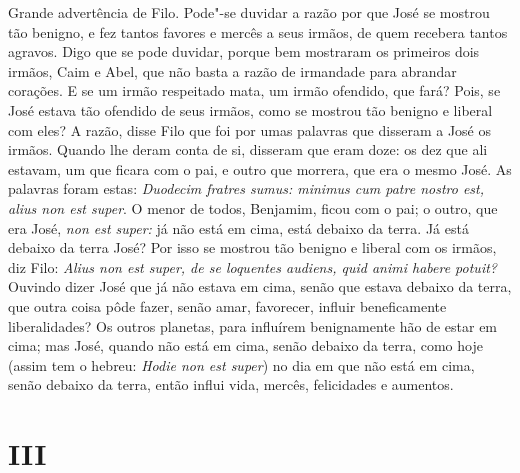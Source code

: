 Grande advertência de Filo. Pode"-se duvidar a razão por que José se
mostrou tão benigno, e fez tantos favores e mercês a seus irmãos, de
quem recebera tantos agravos. Digo que se pode duvidar, porque bem
mostraram os primeiros dois irmãos, Caim e Abel, que não basta a razão
de irmandade para abrandar corações. E se um irmão respeitado mata, um
irmão ofendido, que fará? Pois, se José estava tão ofendido de seus
irmãos, como se mostrou tão benigno e liberal com eles? A razão, disse
Filo que foi por umas palavras que disseram a José os irmãos. Quando lhe
deram conta de si, disseram que eram doze: os dez que ali estavam, um
que ficara com o pai, e outro que morrera, que era o mesmo José. As
palavras foram estas: \emph{Duodecim fratres sumus: minimus cum patre
nostro est, alius non est super}. O menor de todos, Benjamim,
ficou com o pai; o outro, que era José, \emph{non est super:} já não
está em cima, está debaixo da terra. Já está debaixo da terra José?
Por isso se mostrou tão benigno e liberal com os irmãos, diz Filo:
\emph{Alius non est super, de se loquentes audiens, quid animi habere
potuit?} Ouvindo dizer José que já não estava em cima, senão que
estava debaixo da terra, que outra coisa pôde fazer, senão amar,
favorecer, influir beneficamente liberalidades? Os outros planetas, para
influírem benignamente hão de estar em cima; mas José, quando não está
em cima, senão debaixo da terra, como hoje (assim tem o hebreu:
\emph{Hodie non est super}) no dia em que não está em cima, senão
debaixo da terra, então influi vida, mercês, felicidades e aumentos.

\section*{III}

